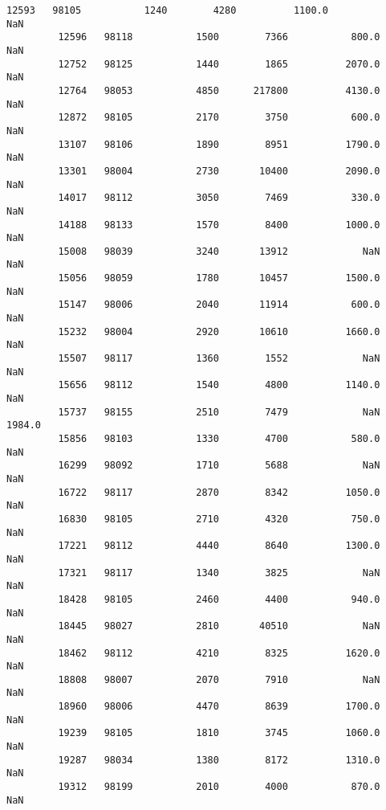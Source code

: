 \documentclass[11pt]{article}
\begin{document}
\begin{Verbatim}[commandchars=\\\{\}]
         12593   98105           1240        4280          1100.0            NaN   
         12596   98118           1500        7366           800.0            NaN   
         12752   98125           1440        1865          2070.0            NaN   
         12764   98053           4850      217800          4130.0            NaN   
         12872   98105           2170        3750           600.0            NaN   
         13107   98106           1890        8951          1790.0            NaN   
         13301   98004           2730       10400          2090.0            NaN   
         14017   98112           3050        7469           330.0            NaN   
         14188   98133           1570        8400          1000.0            NaN   
         15008   98039           3240       13912             NaN            NaN   
         15056   98059           1780       10457          1500.0            NaN   
         15147   98006           2040       11914           600.0            NaN   
         15232   98004           2920       10610          1660.0            NaN   
         15507   98117           1360        1552             NaN            NaN   
         15656   98112           1540        4800          1140.0            NaN   
         15737   98155           2510        7479             NaN         1984.0   
         15856   98103           1330        4700           580.0            NaN   
         16299   98092           1710        5688             NaN            NaN   
         16722   98117           2870        8342          1050.0            NaN   
         16830   98105           2710        4320           750.0            NaN   
         17221   98112           4440        8640          1300.0            NaN   
         17321   98117           1340        3825             NaN            NaN   
         18428   98105           2460        4400           940.0            NaN   
         18445   98027           2810       40510             NaN            NaN   
         18462   98112           4210        8325          1620.0            NaN   
         18808   98007           2070        7910             NaN            NaN   
         18960   98006           4470        8639          1700.0            NaN   
         19239   98105           1810        3745          1060.0            NaN   
         19287   98034           1380        8172          1310.0            NaN   
         19312   98199           2010        4000           870.0            NaN   
         

\end{Verbatim}
\end{document}
